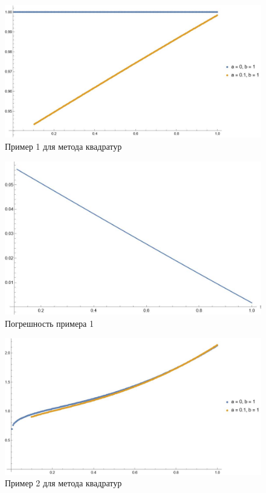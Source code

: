 \documentclass{article}
\begin{document}
	\begin{figure}[H]
        \centering
        \includegraphics[width=\textwidth]{test1_kv.jpg}
        \caption{Пример 1 для метода квадратур}
    \end{figure}
		\begin{figure}[H]
        \centering
        \includegraphics[width=\textwidth]{diff_test1.jpg}
        \caption{Погрешность примера 1}
    \end{figure}
		\begin{figure}[H]
        \centering
        \includegraphics[width=\textwidth]{test2_kv.jpg}
        \caption{Пример 2 для метода квадратур}
    \end{figure}
\end{document}
